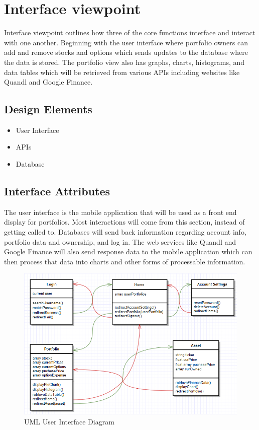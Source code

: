 \documentclass[onecolumn, draftclsnofoot,10pt, compsoc]{IEEEtran}
\begin{document}
\section{Interface viewpoint}

    Interface viewpoint outlines how three of the core functions interface and interact with one another.
    Beginning with the user interface where portfolio owners can add and remove stocks and options which
    sends updates to the database where the data is stored. The portfolio view also has graphs, charts, histograms,
    and data tables which will be retrieved from various APIs including websites like Quandl and Google Finance.
    
\subsection{Design Elements}
    \begin{itemize}
        \item User Interface
        \item APIs
        \item Database
    \end{itemize}

\subsection{Interface Attributes}

    The user interface is the mobile application that will be used as a front end display for portfolios. Most
    interactions will come from this section, instead of getting called to. Databases will send back information
    regarding account info, portfolio data and ownership, and log in. The web services like Quandl and Google 
    Finance will also send response data to the mobile application which can then process that data into charts 
    and other forms of processable information.

\begin{figure}[h]
\centering
\captionsetup{justification=centering}
\includegraphics[width=14cm]{frontend.png}
\caption{UML User Interface Diagram}
\end{figure}
    
\end{document}
